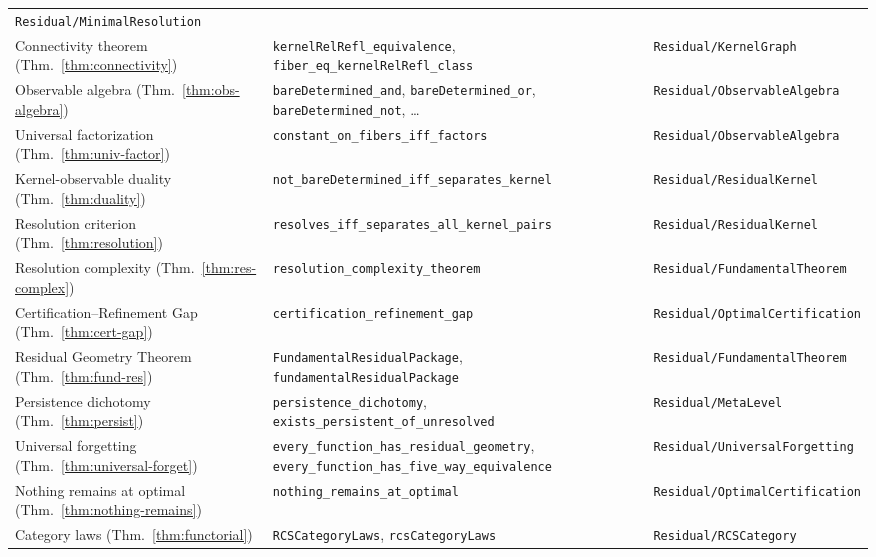 \documentclass[11pt,a4paper]{article}
\theoremstyle{plain}
\theoremstyle{definition}
\theoremstyle{remark}
\begin{document}
\begin{longtable}{>{\footnotesize\raggedright\arraybackslash}p{4.4cm} >{\footnotesize\raggedright\arraybackslash}p{6.4cm} >{\footnotesize\raggedright\arraybackslash}p{3.8cm}}
  \texttt{Residual/\allowbreak{}MinimalResolution} \\[4pt]
%
Connectivity theorem (Thm.~\ref{thm:connectivity}) &
  \texttt{kernelRelRefl\_equivalence},
  \texttt{fiber\_eq\_\allowbreak{}kernelRelRefl\_class} &
  \texttt{Residual/\allowbreak{}KernelGraph} \\[4pt]
%
Observable algebra (Thm.~\ref{thm:obs-algebra}) &
  \texttt{bareDetermined\_and}, \texttt{bareDetermined\_or},
  \texttt{bareDetermined\_not}, \ldots &
  \texttt{Residual/\allowbreak{}ObservableAlgebra} \\[4pt]
%
Universal factorization (Thm.~\ref{thm:univ-factor}) &
  \texttt{constant\_on\_fibers\_\allowbreak{}iff\_factors} &
  \texttt{Residual/\allowbreak{}ObservableAlgebra} \\[4pt]
%
Kernel-observable duality (Thm.~\ref{thm:duality}) &
  \texttt{not\_bareDetermined\_\allowbreak{}iff\_separates\_kernel} &
  \texttt{Residual/\allowbreak{}ResidualKernel} \\[4pt]
%
Resolution criterion (Thm.~\ref{thm:resolution}) &
  \texttt{resolves\_iff\_separates\_\allowbreak{}all\_kernel\_pairs} &
  \texttt{Residual/\allowbreak{}ResidualKernel} \\[4pt]
%
Resolution complexity (Thm.~\ref{thm:res-complex}) &
  \texttt{resolution\_complexity\_\allowbreak{}theorem} &
  \texttt{Residual/\allowbreak{}FundamentalTheorem} \\[4pt]
%
Certification--Refinement Gap (Thm.~\ref{thm:cert-gap}) &
  \texttt{certification\_refinement\_gap} &
  \texttt{Residual/\allowbreak{}OptimalCertification} \\[4pt]
%
Residual Geometry Theorem (Thm.~\ref{thm:fund-res}) &
  \texttt{FundamentalResidualPackage},
  \texttt{fundamentalResidualPackage} &
  \texttt{Residual/\allowbreak{}FundamentalTheorem} \\[4pt]
%
Persistence dichotomy (Thm.~\ref{thm:persist}) &
  \texttt{persistence\_dichotomy},
  \texttt{exists\_persistent\_\allowbreak{}of\_unresolved} &
  \texttt{Residual/\allowbreak{}MetaLevel} \\[4pt]
%
Universal forgetting (Thm.~\ref{thm:universal-forget}) &
  \texttt{every\_function\_has\_\allowbreak{}residual\_geometry},
  \texttt{every\_function\_has\_\allowbreak{}five\_way\_equivalence} &
  \texttt{Residual/\allowbreak{}UniversalForgetting} \\[4pt]
%
Nothing remains at optimal (Thm.~\ref{thm:nothing-remains}) &
  \texttt{nothing\_remains\_at\_optimal} &
  \texttt{Residual/\allowbreak{}OptimalCertification} \\[4pt]
%
Category laws (Thm.~\ref{thm:functorial}) &
  \texttt{RCSCategoryLaws}, \texttt{rcsCategoryLaws} &
  \texttt{Residual/\allowbreak{}RCSCategory} \\
\end{longtable}
\endgroup
\end{document}
